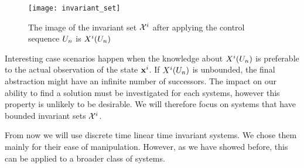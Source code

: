 \begin{figure}
\centering
\texttt{[image: invariant\_set]}
\caption{The image of the invariant set ${\mathcal{X}^i}$ after applying the control sequence $U_n$ is $X^i(U_n)$}
\end{figure}

Interesting case scenarios happen when the knowledge about $X^i(U_n)$ is preferable to the actual observation of the state $ \mathbf{x}^i$.
If $X^i(U_n)$ is unbounded, the final abstraction might have an infinite number of successors. The impact on our ability to find a solution must be investigated for each systems, however this property is unlikely to be desirable.
We will therefore focus on systems that have bounded invariant sets ${\mathcal{X}^i}$.

From now we will use discrete time linear time invariant systems. We chose them mainly for their ease of manipulation. However, as we have showed before, this can be applied to a broader class of systems.